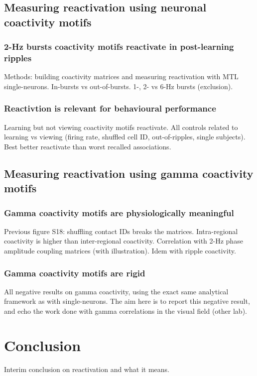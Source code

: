 \documentclass[12pt,a4paper]{report}
\begin{document}
\subsection{Measuring reactivation using neuronal coactivity motifs}
\subsubsection{2-Hz bursts coactivity motifs reactivate in post-learning ripples}
Methods: building coactivity matrices and measuring reactivation with MTL single-neurons. In-bursts vs out-of-bursts. 1-, 2- vs 6-Hz bursts (exclusion).

\subsubsection{Reactivtion is relevant for behavioural performance}
Learning but not viewing coactivity motifs reactivate. All controls related to learning vs viewing (firing rate, shuffled cell ID, out-of-ripples, single subjects). Best better reactivate than worst recalled associations. 

\subsection{Measuring reactivation using gamma coactivity motifs}
\subsubsection{Gamma coactivity motifs are physiologically meaningful}
 Previous figure S18: shuffling contact IDs breaks the matrices. Intra-regional coactivity is higher than inter-regional coactivity. Correlation with 2-Hz phase amplitude coupling matrices (with illustration). Idem with ripple coactivity.

\subsubsection{Gamma coactivity motifs are rigid}
All negative results on gamma coactivity, using the exact same analytical framework as with single-neurons. The aim here is to report this negative result, and echo the work done with gamma correlations in the visual field (other lab).

\section{Conclusion}
Interim conclusion on reactivation and what it means.
\end{document}
